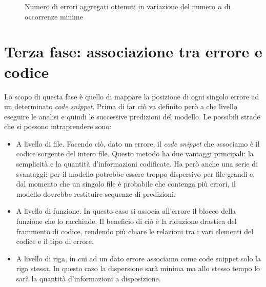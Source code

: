 \begin{figure}[h]
    \centering
    \caption{Numero di errori aggregati ottenuti in variazione del numero $n$ di occorrenze minime}
    \label{fig:grafo_aggregazione}
\end{figure}

\section{Terza fase: associazione tra errore e codice}
Lo scopo di questa fase è quello di mappare la posizione di ogni singolo errore ad un determinato \textit{code snippet}. 
Prima di far ciò va definito però a che livello eseguire le analisi e quindi le successive predizioni del modello.
Le possibili strade che si possono intraprendere sono:
  \begin{itemize}
    \item A livello di file. Facendo ciò, dato un errore, il \textit{code snippet} che associamo è il codice sorgente del intero file. 
          Questo metodo ha due vantaggi principali: la semplicità e la quantità d'informazioni codificate. 
          Ha però anche una serie di svantaggi: per il modello potrebbe essere troppo dispersivo per file grandi e, dal momento che un singolo file è probabile che contenga più errori, il modello dovrebbe restituire sequenze di predizioni.
    \item A livello di funzione. In questo caso si associa all'errore il blocco della funzione che lo racchiude.
          Il beneficio di ciò è la riduzione drastica del frammento di codice, rendendo più chiare le relazioni tra i vari elementi del codice e il tipo di errore.
    \item A livello di riga, in cui ad un dato errore associamo come code snippet solo la riga stessa. In questo caso la dispersione sarà minima ma allo stesso tempo lo sarà la quantità d'informazioni a disposizione.
  \end{itemize}

